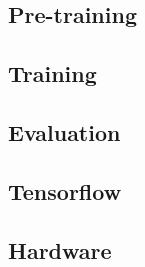 \subsection{Pre-training}
\subsection{Training}
\subsection{Evaluation}


\subsection{Tensorflow}

\subsection{Hardware}
